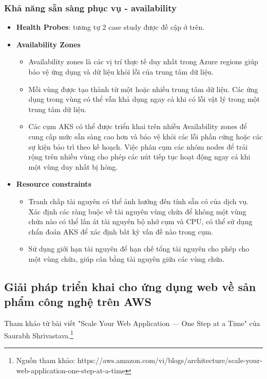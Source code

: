 \subsubsection{Khả năng sẵn sàng phục vụ - availability}
    \begin{itemize}
        \item \textbf{Health Probes}: tương tự 2 case study được đề cập ở trên.
        \item \textbf{Availability Zones}
            \begin{itemize}
                \item Availability zones là các vị trí thực tế duy nhất trong  Azure regions giúp bảo vệ ứng dụng và dữ liệu khỏi lỗi của trung tâm dữ liệu. 
                \item Mỗi vùng được tạo thành từ một hoặc nhiều trung tâm dữ liệu. Các ứng dụng trong vùng có thể vẫn khả dụng ngay cả khi có lỗi vật lý trong một trung tâm dữ liệu. 
                \item Các cụm AKS có thể được triển khai trên nhiều Availability zones để cung cấp mức sẵn sàng cao hơn và bảo vệ khỏi các lỗi phần cứng hoặc các sự kiện bảo trì theo kế hoạch. Việc phân cụm các nhóm nodes để trải rộng trên nhiều vùng cho phép các nút tiếp tục hoạt động ngay cả khi một vùng duy nhất bị hỏng.  
            \end{itemize}
        \item \textbf{Resource constraints}
            \begin{itemize}
                \item Tranh chấp tài nguyên có thể ảnh hưởng đến tính sẵn có của dịch vụ. Xác định các ràng buộc về tài nguyên vùng chứa để không một vùng chứa nào có thể lấn át tài nguyên bộ nhớ cụm và CPU, có thể sử dụng chẩn đoán AKS để xác định bất kỳ vấn đề nào trong cụm.
                \item Sử dụng giới hạn tài nguyên để hạn chế tổng tài nguyên cho phép cho một vùng chứa, giúp cân bằng tài nguyên giữa các vùng chứa. 
            \end{itemize}
    \end{itemize}
\subsection{Giải pháp triển khai cho ứng dụng web về sản phẩm công nghệ trên AWS}
\noindent Tham khảo từ bài viết "Scale Your Web Application — One Step at a Time" của Saurabh Shrivastava.\footnote{Nguồn tham khảo: https://aws.amazon.com/vi/blogs/architecture/scale-your-web-application-one-step-at-a-time}
